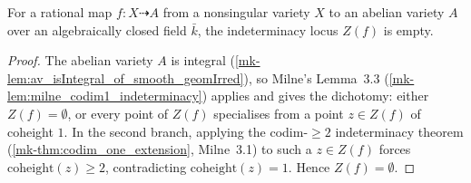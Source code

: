 \begin{lemma}\label{mk-lem:av_indeterminacyLocus_eq_empty}
  \leanok

  For a rational map \(f \colon X \dashrightarrow A\) from a nonsingular variety
  \(X\) to an abelian variety \(A\) over an algebraically closed field \(\bar k\),
  the indeterminacy locus \(Z(f)\) is empty.
\end{lemma}
\begin{proof}
  The abelian variety \(A\) is integral
  (\ref{mk-lem:av_isIntegral_of_smooth_geomIrred}), so Milne's Lemma~3.3
  (\ref{mk-lem:milne_codim1_indeterminacy}) applies and gives the dichotomy: either
  \(Z(f) = \emptyset\), or every point of \(Z(f)\) specialises from a point
  \(z \in Z(f)\) of coheight \(1\). In the second branch, applying the
  codim-\(\geq 2\) indeterminacy theorem (\ref{mk-thm:codim_one_extension},
  Milne~3.1) to such a \(z \in Z(f)\) forces \(\mathrm{coheight}(z) \geq 2\),
  contradicting \(\mathrm{coheight}(z) = 1\). Hence \(Z(f) = \emptyset\).
\end{proof}

